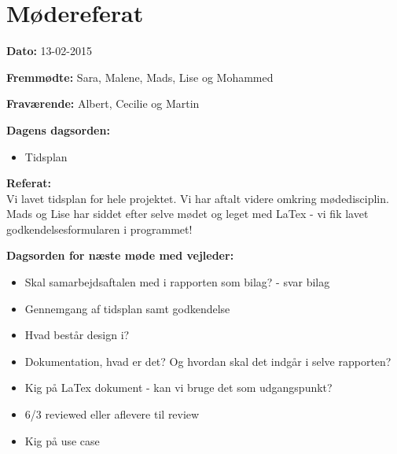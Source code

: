 \chapter{Mødereferat}

\textbf{Dato:} 13-02-2015

\textbf{Fremmødte:} Sara, Malene, Mads, Lise og Mohammed 

\textbf{Fraværende:} Albert, Cecilie og Martin

\textbf{Dagens dagsorden:}
\begin{itemize}
	\item Tidsplan
\end{itemize}

\textbf{Referat:}\\ 
Vi lavet tidsplan for hele projektet. Vi har aftalt videre omkring mødedisciplin. Mads og Lise har siddet efter selve mødet og leget med LaTex - vi fik lavet godkendelsesformularen i programmet! 

\textbf{Dagsorden for næste møde med vejleder:}
\begin{itemize}

	\item Skal samarbejdsaftalen med i rapporten som bilag? - svar bilag
	\item Gennemgang af tidsplan samt godkendelse 
	\item Hvad består design i? 
	\item Dokumentation, hvad er det? Og hvordan skal det indgår i selve rapporten? 
	\item Kig på LaTex dokument - kan vi bruge det som udgangspunkt?
	\item 6/3 reviewed eller aflevere til review
	\item Kig på use case
 
\end{itemize}
	
